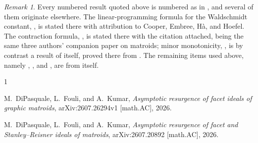\documentclass[11pt]{amsart}
\theoremstyle{remark}
\newtheorem*{remark}{Remark}
\begin{document}
\begin{remark}
Every numbered result quoted above is numbered as in \cite{DFK}, and
several of them originate elsewhere. The linear-programming formula for
the Waldschmidt constant, \cite[Theorem~2.3]{DFK}, is stated there with
attribution to Cooper, Embree, H\`a, and Hoefel. The contraction
formula, \cite[Theorem~2.5]{DFK}, is stated there with the citation
\cite[Proposition~3.8 and Theorem~3.9]{DFKmat} attached, \cite{DFKmat}
being the same three authors' companion paper on matroids; minor
monotonicity, \cite[Proposition~2.4]{DFK}, is by contrast a result of
\cite{DFK} itself, proved there from \cite[Corollary~3.4 and
Remark~3.7]{DFKmat}. The remaining items used
above, namely \cite[Corollary~2.2]{DFK},
\cite[Theorems~3.2, 3.3 and~5.5]{DFK}, \cite[Example~6.1]{DFK} and
\cite[Table~1]{DFK}, are from \cite{DFK} itself.
\end{remark}

\begin{thebibliography}{1}

M.~DiPasquale, L.~Fouli, and A.~Kumar,
\emph{Asymptotic resurgence of facet ideals of graphic matroids},
arXiv:2607.26294v1 [math.AC], 2026.

M.~DiPasquale, L.~Fouli, and A.~Kumar,
\emph{Asymptotic resurgence of facet and Stanley--Reisner ideals of
matroids},
arXiv:2607.20892 [math.AC], 2026.

\end{thebibliography}
\end{document}
